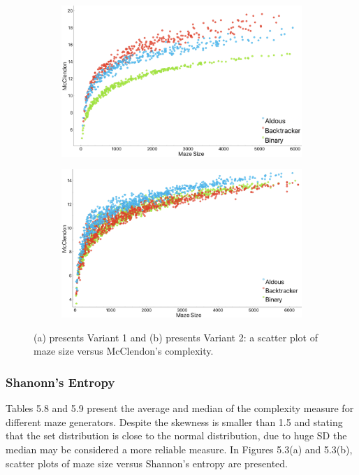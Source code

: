         \begin{figure}[!h]
            \centering
            \begin{subfigure}[!h]{0.7\textwidth}
               \includegraphics[width=1\linewidth]{MClendon_variant1.png}
               \caption{}
            \end{subfigure}
            \begin{subfigure}[!h]{0.7\textwidth}
               \includegraphics[width=1\linewidth]{McClendon_variant2.png}
               \caption{}
            \end{subfigure}
            \caption{(a) presents Variant 1 and (b) presents Variant 2: a scatter plot of maze size versus McClendon's complexity.}
            \end{figure}%
\subsubsection{Shanonn's Entropy}
Tables 5.8 and 5.9 present the average and median of the complexity measure for different maze generators. Despite the skewness is smaller than 1.5 and stating that the set
distribution is close to the normal distribution, due to huge SD the median may be considered a more reliable measure. In Figures 5.3(a) and 5.3(b), scatter
plots of maze size versus Shannon's entropy are presented.\\

